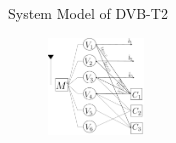 \documentclass[11pt, aspectratio=169]{beamer}
\begin{document}
\begin{frame}{System Model of DVB-T2}
\begin{figure}
\begin{minipage}{.5\linewidth}
		\vspace{0.5cm}
	\end{minipage}
	\hfill
	\hspace{ -2in}
	\begin{minipage}{.5\linewidth}
		\hspace{4.5 cm}
		\includegraphics[width=1in]{sumber/Decoder.pdf}
		\vspace{-0.9cm}
	\end{minipage}
	\label{gambar: awgnhasil}
\end{figure}


\end{frame}
\end{document}
